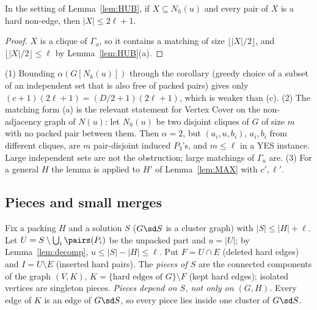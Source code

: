 \begin{corollary}\label{cor:HUB}
In the setting of Lemma~\ref{lem:HUB}, if $X\subseteq N_h(u)$ and every pair of $X$ is a hard non-edge, then $|X|\le2\ell+1$.
\end{corollary}
\begin{proof}
$X$ is a clique of $\Gamma_u$, so it contains a matching of size $\lfloor|X|/2\rfloor$, and $\lfloor|X|/2\rfloor\le\ell$ by Lemma~\ref{lem:HUB}(a).
\end{proof}
\begin{remark}\label{rem:hubalpha}
(1) Bounding $\alpha(G[N_h(u)])$ through the corollary (greedy choice of a subset of an independent set that is also free of packed pairs) gives only $(c+1)(2\ell+1)=(D/2+1)(2\ell+1)$, which is weaker than (c). (2) The matching form (a) is the relevant statement for Vertex Cover on the non-adjacency graph of $N(u)$: let $N_h(u)$ be two disjoint cliques of $G$ of size $m$ with no packed pair between them. Then $\alpha=2$, but $(a_i,u,b_i)$, $a_i,b_i$ from different cliques, are $m$ pair-disjoint induced $P_3$'s, and $m\le\ell$ in a YES instance. Large independent sets are not the obstruction; large matchings of $\Gamma_u$ are. (3) For a general $H$ the lemma is applied to $H'$ of Lemma~\ref{lem:MAX} with $c',\ell'$.
\end{remark}

\subsection{Pieces and small merges}
Fix a packing $H$ and a solution $S$ ($G\sd S$ is a cluster graph) with $|S|\le|H|+\ell$. Let $U=S\setminus\bigcup_i\pairs(P_i)$ be the unpacked part and $u=|U|$; by Lemma~\ref{lem:decomp}, $u\le|S|-|H|\le\ell$. Put $F=U\cap E$ (deleted hard edges) and $I=U\setminus E$ (inserted hard pairs). The \emph{pieces of $S$} are the connected components of the graph $(V,K)$, $K=\{\text{hard edges of }G\}\setminus F$ (kept hard edges); isolated vertices are singleton pieces. \emph{Pieces depend on $S$, not only on $(G,H)$.} Every edge of $K$ is an edge of $G\sd S$, so every piece lies inside one cluster of $G\sd S$.

